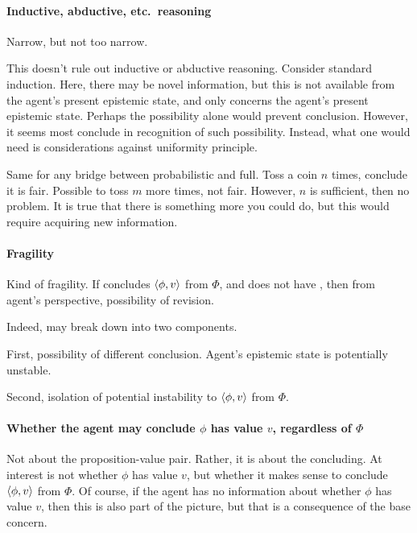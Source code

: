 \paragraph*{Inductive, abductive, etc.\ reasoning}

\begin{note}
  Narrow, but not too narrow.
\end{note}

\begin{note}
  This doesn't rule out inductive or abductive reasoning.
  Consider standard induction.
  Here, there may be novel information, but this is not available from the agent's present epistemic state, and \qzS{} only concerns the agent's present epistemic state.
  Perhaps the possibility alone would prevent conclusion.
  However, it seems most conclude in recognition of such possibility.
  Instead, what one would need is considerations against uniformity principle.

  Same for any bridge between probabilistic and full.
  Toss a coin \(n\) times, conclude it is fair.
  Possible to toss \(m\) more times, not fair.
  However, \(n\) is sufficient, then no problem.
  It is true that there is something more you could do, but this would require acquiring new information.
\end{note}

\paragraph*{Fragility}

\begin{note}
  Kind of fragility.
  If concludes \(\langle \phi, v \rangle\) from \(\Phi\), and does not have \zS{}, then from agent's perspective, possibility of revision.

  Indeed, may break down into two components.

  First, possibility of different conclusion.
  Agent's epistemic state is potentially unstable.

  Second, isolation of potential instability to \(\langle \phi, v \rangle\) from \(\Phi\).
\end{note}

\paragraph*{Whether the agent may conclude \(\phi\) has value \(v\), regardless of \(\Phi\)}

\begin{note}
  Not about the proposition-value pair.
  Rather, it is about the concluding.
  At interest is not whether \(\phi\) has value \(v\), but whether it makes sense to conclude \(\langle \phi, v \rangle\) from \(\Phi\).
  Of course, if the agent has no information about whether \(\phi\) has value \(v\), then this is also part of the picture, but that is a consequence of the base concern.
\end{note}

